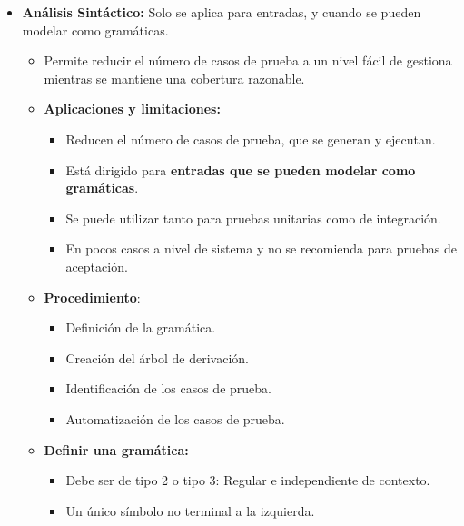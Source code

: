\documentclass[12pt, twoside, openright]{report} %
\begin{document}
\begin{itemize}
\item
  \textbf{Análisis Sintáctico:} Solo se aplica para entradas, y cuando
  se pueden modelar como gramáticas.

  \begin{itemize}
  \item Permite reducir el número de casos de prueba a un nivel fácil de
    gestiona mientras se mantiene una cobertura razonable.
    
  \item \textbf{Aplicaciones y limitaciones:}
    

    \begin{itemize}
    \item Reducen el número de casos de prueba, que se generan y ejecutan.
      
    \item Está dirigido para \textbf{entradas que se pueden modelar como
      gramáticas}.
      
    \item Se puede utilizar tanto para pruebas unitarias como de
      integración.
      
    \item En pocos casos a nivel de sistema y no se recomienda para pruebas
      de aceptación.
      
    \end{itemize}
  \item \textbf{Procedimiento}:
    

    \begin{itemize}
    \item Definición de la gramática.
      
    \item Creación del árbol de derivación.
      
    \item Identificación de los casos de prueba.
      
    \item Automatización de los casos de prueba.
      
    \end{itemize}
  \item \textbf{Definir una gramática:}
    

    \begin{itemize}
    \item Debe ser de tipo 2 o tipo 3: Regular e independiente de contexto.
      
    \item Un único símbolo no terminal a la izquierda.
      

\end{itemize}
\end{itemize}
\end{itemize}
\end{document}
